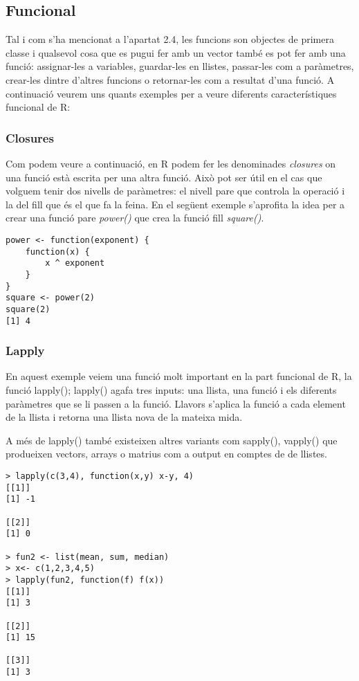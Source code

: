 \documentclass[12pt]{article}
\begin{document}
\subsection{Funcional}
Tal i com s'ha mencionat a l'apartat 2.4, les funcions son objectes de primera classe i qualsevol cosa que es pugui fer amb un vector també es pot fer amb una funció: assignar-les a variables, guardar-les en llistes, passar-les com a paràmetres, crear-les dintre d'altres funcions o retornar-les com a resultat d'una funció. A continuació veurem uns quants exemples per a veure diferents característiques funcional de R: 

\medskip
\subsubsection{Closures}
Com podem veure a continuació, en R podem fer les denominades \textit{closures} on una funció està escrita per una altra funció. Això pot ser útil en el cas que volguem tenir dos nivells de paràmetres: el nivell pare que controla la operació i la del fill que és el que fa la feina. En el següent exemple s'aprofita la idea per a crear una funció pare \textit{power()} que crea la funció fill \textit{square()}.

\begin{verbatim}
power <- function(exponent) {
	function(x) {
		x ^ exponent
	}
}
square <- power(2)
square(2)
[1] 4
\end{verbatim}


\medskip
\subsubsection{Lapply}
En aquest exemple veiem una funció molt important en la part funcional de R, la funció lapply(); lapply() agafa tres inputs: una llista, una funció i els diferents paràmetres que se li passen a la funció. Llavors s'aplica la funció a cada element de la llista i retorna una llista nova de la mateixa mida. 

A més de lapply() també existeixen altres variants com sapply(), vapply() que produeixen vectors, arrays o  matrius com a output en comptes de de llistes.
\begin{verbatim}
> lapply(c(3,4), function(x,y) x-y, 4)
[[1]]
[1] -1

[[2]]
[1] 0

> fun2 <- list(mean, sum, median)
> x<- c(1,2,3,4,5)
> lapply(fun2, function(f) f(x))
[[1]]
[1] 3

[[2]]
[1] 15

[[3]]
[1] 3

\end{verbatim}
 
\end{document}
